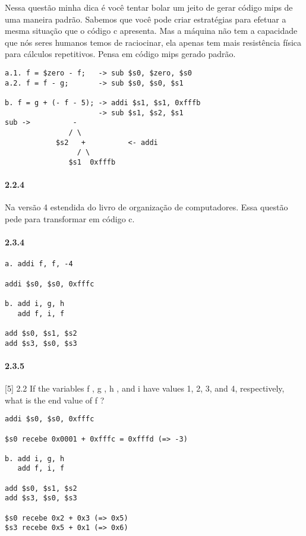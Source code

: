 \documentclass{article}
\begin{document}
Nessa questão minha dica é você tentar bolar um jeito de gerar código mips de
uma maneira padrão. Sabemos que você pode criar estratégias para efetuar a mesma
situação que o código c apresenta. Mas a máquina não tem a capacidade que nós
seres humanos temos de raciocinar, ela apenas tem mais resistência física para
cálculos repetitivos. Pensa em código mips gerado padrão.

\begin{verbatim}
a.1. f = $zero - f;   -> sub $s0, $zero, $s0
a.2. f = f - g;       -> sub $s0, $s0, $s1

b. f = g + (- f - 5); -> addi $s1, $s1, 0xfffb
                      -> sub $s1, $s2, $s1
sub ->          -
               / \
            $s2   +          <- addi
                 / \
               $s1  0xfffb
\end{verbatim}

\paragraph{2.2.4}

Na versão 4 estendida do livro de organização de computadores. Essa questão 
pede para transformar em código c.

\paragraph{2.3.4}

\begin{verbatim}
a. addi f, f, -4

addi $s0, $s0, 0xfffc

b. add i, g, h
   add f, i, f

add $s0, $s1, $s2
add $s3, $s0, $s3
\end{verbatim}

\paragraph{2.3.5} [5] 2.2 If the variables f , g , h , and i have values 1, 2,
3, and 4, respectively, what is the end value of f ?

\begin{verbatim}
addi $s0, $s0, 0xfffc

$s0 recebe 0x0001 + 0xfffc = 0xfffd (=> -3)

b. add i, g, h
   add f, i, f

add $s0, $s1, $s2
add $s3, $s0, $s3

$s0 recebe 0x2 + 0x3 (=> 0x5)
$s3 recebe 0x5 + 0x1 (=> 0x6)

\end{verbatim}
\end{document}
